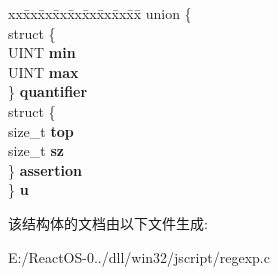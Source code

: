 \begin{DoxyCompactItemize}
\begin{tabbing}
\end{tabbing}\item 
\mbox{\label{struct_r_e_prog_state_aadc208359a91b709be8bfaf1aeb8da0e}} 
\begin{tabbing}
xx\=xx\=xx\=xx\=xx\=xx\=xx\=xx\=xx\=\kill
union \{\\
\>struct \{\\
\>\>UINT {\bfseries min}\\
\>\>UINT {\bfseries max}\\
\>\} {\bfseries quantifier}\\
\>struct \{\\
\>\>size\_t {\bfseries top}\\
\>\>size\_t {\bfseries sz}\\
\>\} {\bfseries assertion}\\
\} {\bfseries u}\\

\end{tabbing}\end{DoxyCompactItemize}


该结构体的文档由以下文件生成\+:\begin{DoxyCompactItemize}
\item 
E\+:/\+React\+O\+S-\/0../dll/win32/jscript/regexp.\+c\end{DoxyCompactItemize}
